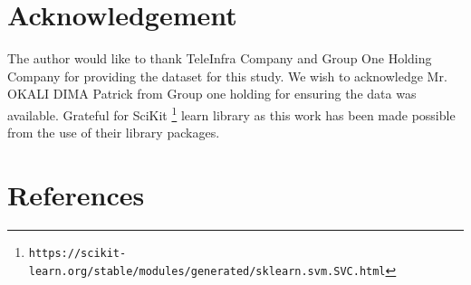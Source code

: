 \documentclass[final,5p,times,twocolumn,authoryear]{elsarticle}
\begin{document}
\section{Acknowledgement }
The author would like to thank TeleInfra Company and Group One Holding Company for providing the dataset for this study. We wish to acknowledge Mr. OKALI DIMA Patrick from Group one holding for ensuring the data was available. Grateful for SciKit \footnote{{\tt https://scikit-learn.org/stable/modules/generated/sklearn.svm.SVC.html}} learn library as this work has been made possible from the use of their library packages.
\section{References} \label{sec:references}
  
% 
% 
% 
\end{document}
